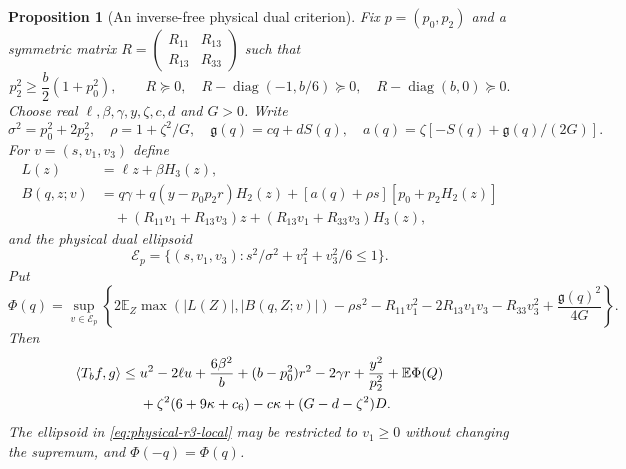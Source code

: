 \documentclass[11pt]{article}
\newcommand{\R}{\mathbb R}
\newtheorem{proposition}[theorem]{Proposition}
\begin{document}
\begin{proposition}[An inverse-free physical dual criterion]
\label{prop:physical-r3-dual}
Fix $p=(p_0,p_2)$ and a symmetric matrix
$R=\left(\begin{smallmatrix}R_{11}&R_{13}\\R_{13}&R_{33}\end{smallmatrix}\right)$
such that
\begin{equation}\label{eq:physical-r3-gates}
 p_2^2\geq\frac b2(1+p_0^2),\qquad
 R\succeq0,\quad R-\operatorname{diag}(-1,b/6)\succeq0,
 \quad R-\operatorname{diag}(b,0)\succeq0.
\end{equation}
Choose real $\ell,\beta,\gamma,y,\zeta,c,d$ and $G>0$.  Write
\[
 \sigma^2=p_0^2+2p_2^2,\quad \rho=1+\zeta^2/G,\quad
 \mathfrak g(q)=cq+dS(q),\quad a(q)=\zeta[-S(q)+\mathfrak g(q)/(2G)].
\]
For $v=(s,v_1,v_3)$ define
\begin{align*}
 L(z)&=\ell z+\beta H_3(z),\\
 B(q,z;v)&=q\gamma+q(y-p_0p_2r)H_2(z)
       +[a(q)+\rho s][p_0+p_2H_2(z)]\\
 &\quad +(R_{11}v_1+R_{13}v_3)z
       +(R_{13}v_1+R_{33}v_3)H_3(z),
\end{align*}
and the physical dual ellipsoid
\[
 \mathcal E_p=\{(s,v_1,v_3):s^2/\sigma^2+v_1^2+v_3^2/6\leq1\}.
\]
Put
\begin{equation}\label{eq:physical-r3-local}
 \Phi(q)=\sup_{v\in\mathcal E_p}\left\{
 2\mathbb E_Z\max(|L(Z)|,|B(q,Z;v)|)
 -\rho s^2-R_{11}v_1^2-2R_{13}v_1v_3-R_{33}v_3^2
 +\frac{\mathfrak g(q)^2}{4G}\right\}.
\end{equation}
Then
\begin{align}\label{eq:physical-r3-criterion}
 \langle T_bf,g\rangle\leq{}&u^2-2\ell u+\frac{6\beta^2}{b}
 +(b-p_0^2)r^2-2\gamma r+\frac{y^2}{p_2^2}
 +\mathbb E\Phi(Q)\notag\\
 &+\zeta^2(6+9\kappa+c_6)-c\kappa+(G-d-\zeta^2)D.
\end{align}
The ellipsoid in \eqref{eq:physical-r3-local} may be restricted to
$v_1\geq0$ without changing the supremum, and $\Phi(-q)=\Phi(q)$.
\end{proposition}
\end{document}
